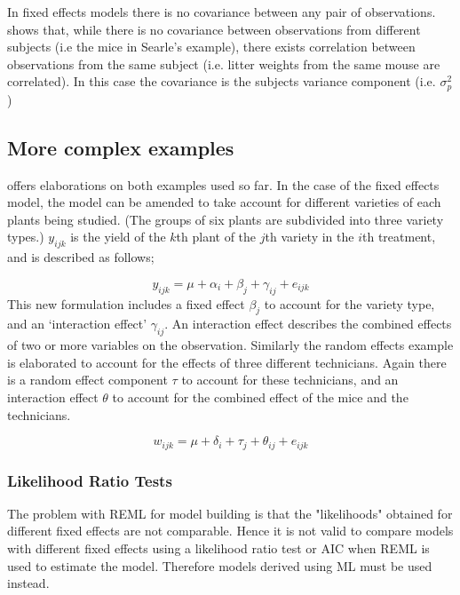 \documentclass[12pt, a4paper]{report}
\theoremstyle{plain}
\theoremstyle{definition}
\theoremstyle{remark}
\begin{document}
In fixed effects models there is no covariance between any pair of
observations. \citet*{BrownPrescott} shows that, while there is no
covariance between observations from different subjects (i.e the
mice in Searle's example), there exists correlation between
observations from the same subject (i.e. litter weights from the
same mouse are correlated). In this case the covariance is the
subjects variance component (i.e. $\sigma^{2}_{p}$)

\subsection{More complex examples}
\citet{Searle} offers elaborations on both examples used so far.
In the case of the fixed effects model, the model can be amended
to take account for different varieties of each plants being
studied. (The groups of six plants are subdivided into three
variety types.) $y_{ijk}$ is the yield of the $k$th plant of the
$j$th variety in the $i$th treatment, and is described as follows;

\begin{equation}
y_{ijk} = \mu + \alpha_{i} + \beta_{j} + \gamma_{ij} + e_{ijk}
\end{equation}
This new formulation includes a fixed effect $\beta_{j}$ to
account for the variety type, and an `interaction effect'
$\gamma_{ij}$. An interaction effect describes the combined
effects of two or more variables on the observation. Similarly the
random effects example is elaborated to account for the effects of
three different technicians. Again there is a random effect
component $\tau$ to account for these technicians, and an
interaction effect $\theta$ to account for the combined effect of
the mice and the technicians.

\begin{equation}
w_{ijk} = \mu + \delta_{i} + \tau_{j} + \theta_{ij} + e_{ijk}
\end{equation}


\subsubsection{Likelihood Ratio Tests} The problem with REML for
model building is that the "likelihoods" obtained for different
fixed effects are not comparable. Hence it is not valid to compare
models with different fixed effects using a likelihood ratio test
or AIC when REML is used to estimate the model. Therefore models
derived using ML must be used instead.
\end{document}
